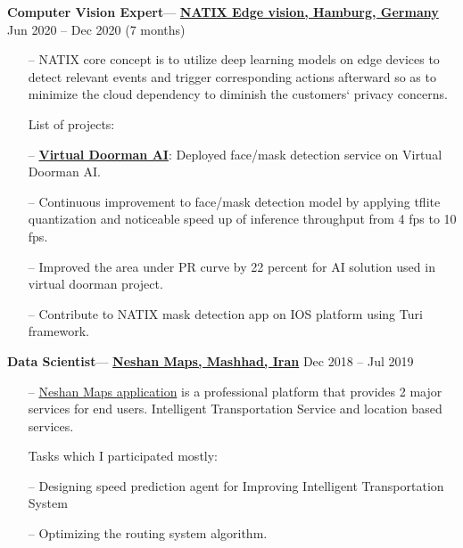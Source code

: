 \documentclass[10pt]{article}
\newenvironment{loneinnerlist}[1][\enskip\textbullet]%
{\vspace{-\baselineskip}\begin{compactitem}[#1]}
	{\end{compactitem}\vspace{-.6\baselineskip}}
\newcommand{\halfblankline}{\quad\vspace{-0.5\baselineskip}\pagebreak[3]}
\begin{document}
\begin{loneinnerlist}
\begin{itemize}
		\end{itemize}
		
		\item \textbf{Computer Vision Expert}— \href{https://www.natix.io}{\textbf{NATIX Edge vision, Hamburg, Germany}} Jun 2020 -- Dec 2020 (7 months)
		
		\begin{itemize}
			\item[--] NATIX core concept is to utilize deep learning models on edge devices to detect relevant events and trigger corresponding actions afterward  so as to minimize the cloud dependency to diminish the customers` privacy concerns.
			
			List of projects:
			\item[--] \href{https://www.natix.io/products/virtual-doorman}{\textbf{Virtual Doorman AI}}: Deployed face/mask detection service on Virtual Doorman AI.
			\item[--] Continuous improvement to face/mask detection model by applying tflite quantization and noticeable speed up of inference throughput from 4 fps to 10 fps.
			\item[--] Improved the area under PR curve by 22 percent for AI solution used in virtual doorman project.
			\item[--] Contribute to NATIX mask detection app on IOS platform using Turi framework.
		\end{itemize}
		
		\item \textbf{Data Scientist}— \href{https://neshan.org/}{\textbf{Neshan Maps, Mashhad, Iran}} Dec 2018 -- Jul 2019
		
		\begin{itemize}
			\item[--] \href{https://play.google.com/store/apps/details?id=org.rajman.neshan.traffic.tehran.navigator&hl=en_US}{Neshan Maps application} is a professional platform that provides 2 major services for end users. Intelligent Transportation Service and location based services.
			
			Tasks which I participated mostly:
			\item[--] Designing speed prediction agent for Improving Intelligent Transportation System
			\item[--] Optimizing the routing system algorithm.
			
			
		\end{itemize}
		
		\halfblankline
		
	\end{loneinnerlist}
	
\end{document}
